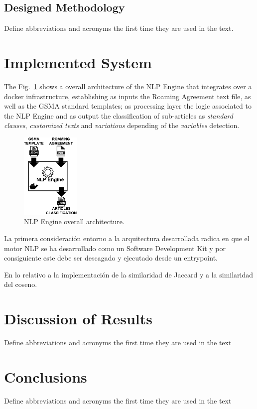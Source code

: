 \documentclass[conference]{style/IEEEtran}
\begin{document}
\subsection{Designed Methodology}
Define abbreviations and acronyms the first time they are used in the text.

\section{Implemented System}
The Fig.~\ref{fig1} shows a overall architecture of the NLP Engine that integrates over a docker infrastructure, establishing as inputs the Roaming Agreement text file, as well as the GSMA standard templates; as processing layer the logic associated to the NLP Engine and as output the classification of sub-articles as \textit{standard clauses}, \textit{customized texts} and \textit{variations} depending of the \textit{variables} detection.

\begin{figure}[htbp]
\centerline{\includegraphics[width=0.25\textwidth]{images/NLP_Engine.png}}
\caption{NLP Engine overall architecture.}
\label{fig1}
\end{figure}

La primera consideración entorno a la arquitectura desarrollada radica en que el motor NLP se ha desarrollado como un Software Development Kit y por consiguiente este debe ser descagado y ejecutado desde un entrypoint. 

En lo relativo a la implementación de la similaridad de Jaccard y a la similaridad del coseno.

\section{Discussion of Results}
Define abbreviations and acronyms the first time they are used in the text

\section{Conclusions}
Define abbreviations and acronyms the first time they are used in the text
\end{document}
